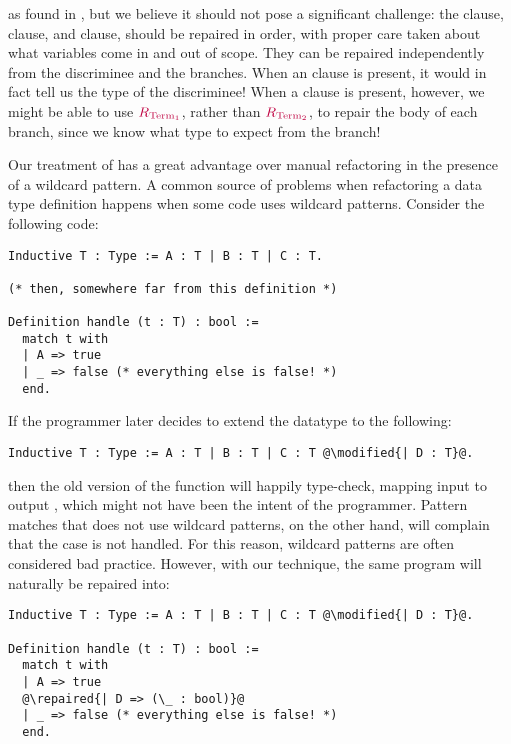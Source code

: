 \noindent%
%
as found in \Coq{}, but we believe it should not pose a significant challenge:
the  clause,  clause, and  clause,
should be repaired in order, with proper care taken about what variables come in
and out of scope.  They can be repaired independently from the discriminee and
the branches.  When an  clause is present, it would in fact tell
us the type of the discriminee!  When a  clause is present,
however, we might be able to use $\textcolor{purple}{R_{\text{Term}_1}}{}$, rather than
$\textcolor{purple}{R_{\text{Term}_2}}{}$, to repair the body of each branch, since we know what
type to expect from the branch!

Our treatment of  has a great advantage over manual refactoring
in the presence of a wildcard pattern.  A common source of problems when
refactoring a data type definition happens when some code uses wildcard
patterns.  Consider the following code:

\begin{verbatim}
Inductive T : Type := A : T | B : T | C : T.

(* then, somewhere far from this definition *)

Definition handle (t : T) : bool :=
  match t with
  | A => true
  | _ => false (* everything else is false! *)
  end.
\end{verbatim}

\noindent%
%
If the programmer later decides to extend the datatype to the following:

\begin{verbatim}
Inductive T : Type := A : T | B : T | C : T @\modified{| D : T}@.
\end{verbatim}

\noindent%
%
then the old version of the  function will happily type-check,
mapping input  to output , which might not have
been the intent of the programmer.  Pattern matches that does not use wildcard
patterns, on the other hand, will complain that the  case is not
handled.  For this reason, wildcard patterns are often considered bad practice.
However, with our technique, the same program will naturally be repaired into:

\begin{verbatim}
Inductive T : Type := A : T | B : T | C : T @\modified{| D : T}@.

Definition handle (t : T) : bool :=
  match t with
  | A => true
  @\repaired{| D => (\_ : bool)}@
  | _ => false (* everything else is false! *)
  end.
\end{verbatim}

